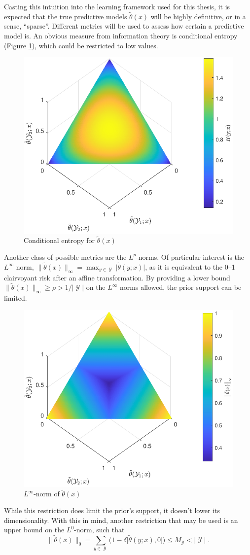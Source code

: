 \documentclass[12pt]{article}
\DeclareMathOperator{\Ycal}{\mathcal{Y}}
\begin{document}
Casting this intuition into the learning framework used for this thesis, it is expected that the true predictive models $\tilde{\theta}(x)$ will be highly definitive, or in a sense, ``sparse''. Different metrics will be used to assess how certain a predictive model is. An obvious measure from information theory is conditional entropy (Figure \ref{fig:theta_tilde_entropy}), which could be restricted to low values. 
\begin{figure}
\centering
\includegraphics[width=0.6\linewidth]{theta_tilde_entropy.pdf}
\caption{Conditional entropy for $\tilde{\theta}(x)$}
\label{fig:theta_tilde_entropy}
\end{figure}
Another class of possible metrics are the $L^p$-norms. Of particular interest is the $L^{\infty}$ norm, $\big\| \tilde{\theta}(x) \big\|_{\infty} = \max_{y \in \Ycal} \big| \tilde{\theta}(y;x) \big|$, as it is equivalent to the 0--1 clairvoyant risk after an affine transformation. By providing a lower bound $\big\| \tilde{\theta}(x) \big\|_{\infty} \geq \rho > 1/|\Ycal|$ on the $L^{\infty}$ norms allowed, the prior support can be limited.
\begin{figure}
\centering
\includegraphics[width=0.6\linewidth]{theta_tilde_Linf.pdf}
\caption{$L^{\infty}$-norm of $\tilde{\theta}(x)$}
\label{fig:theta_tilde_Linf}
\end{figure}
While this restriction does limit the prior's support, it doesn't lower its dimensionality. With this in mind, another restriction that may be used is an upper bound on the $L^0$-norm, such that
\begin{equation}
\big\| \tilde{\theta}(x) \big\|_0  = \sum_{y \in \Ycal} \Big(1 - \delta\big[ \tilde{\theta}(y;x),0 \big] \Big) \leq M_{\Ycal} < |\Ycal| \;.
\end{equation}
\end{document}
